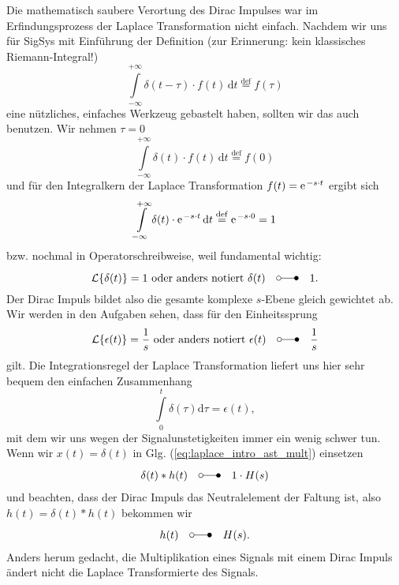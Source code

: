 \documentclass[11pt,a4paper,DIV=12]{scrartcl}
\numberwithin{equation}{section}
\numberwithin{figure}{section}
\newcommand\fsd{\mathrm{d}} %
\newcommand{\eq}[1]{Glg. (\ref{#1})} %
\begin{document}
Die mathematisch saubere Verortung des Dirac Impulses war im Erfindungsprozess
der Laplace Transformation nicht einfach. Nachdem wir uns für SigSys mit Einführung
der Definition (zur Erinnerung: kein klassisches Riemann-Integral!)
\begin{equation}
\int\limits_{-\infty}^{+\infty} \delta(t-\tau) \cdot f(t) \, \fsd t \stackrel{\mathrm{def}}= f(\tau)
\end{equation}
eine nützliches, einfaches Werkzeug gebastelt haben, sollten wir das auch
benutzen.
Wir nehmen $\tau=0$
\begin{equation}
\int\limits_{-\infty}^{+\infty} \delta(t) \cdot f(t) \, \fsd t \stackrel{\mathrm{def}}= f(0)
\end{equation}
und für den Integralkern der Laplace Transformation $f(t)=\e^{-s \cdot t}$
ergibt sich
\begin{equation}
\int\limits_{-\infty}^{+\infty} \delta(t) \cdot \e^{-s \cdot t} \, \fsd t \stackrel{\mathrm{def}}= \e^{-s \cdot 0} = 1
\end{equation}
bzw. nochmal in Operatorschreibweise, weil fundamental wichtig:
%
\begin{equation}
  \mathcal{L}\{\delta(t)\} = 1
  \text{ oder anders notiert }
  \delta(t) \quad\laplace\quad 1.
\end{equation}
%
Der Dirac Impuls bildet also die gesamte komplexe $s$-Ebene gleich gewichtet ab.
%
Wir werden in den Aufgaben sehen, dass für den Einheitssprung
\begin{equation}
  \mathcal{L}\{\epsilon(t)\} = \frac{1}{s}
  \text{ oder anders notiert }
  \epsilon(t) \quad\laplace\quad \frac{1}{s}
\end{equation}
gilt.
Die Integrationsregel der Laplace Transformation liefert uns hier sehr bequem
den einfachen Zusammenhang
\begin{equation}
  \int\limits_{0}^{t} \delta(\tau)\fsd \tau = \epsilon(t),
\end{equation}
mit dem wir uns wegen der Signalunstetigkeiten immer ein wenig schwer tun.
%
Wenn wir $x(t)=\delta(t)$ in \eq{eq:laplace_intro_ast_mult} einsetzen
\begin{align}
\delta(t) \ast h(t) \quad\laplace\quad 1 \cdot H(s)
\end{align}
und beachten, dass der Dirac Impuls das Neutralelement der Faltung ist,
also $h(t) = \delta(t) \ast h(t)$ bekommen wir
\begin{align}
h(t) \quad\laplace\quad H(s).
\end{align}
Anders herum gedacht, die Multiplikation eines Signals mit einem Dirac Impuls
ändert nicht die Laplace Transformierte des Signals.
\end{document}
